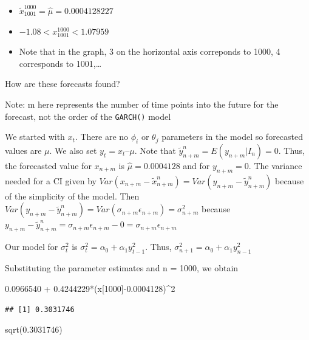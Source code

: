 \documentclass[
]{book}
\newenvironment{Shaded}{\begin{snugshade}}{\end{snugshade}}
\newcommand{\DecValTok}[1]{\textcolor[rgb]{0.00,0.00,0.81}{#1}}
\newcommand{\FloatTok}[1]{\textcolor[rgb]{0.00,0.00,0.81}{#1}}
\newcommand{\FunctionTok}[1]{\textcolor[rgb]{0.00,0.00,0.00}{#1}}
\newcommand{\NormalTok}[1]{#1}
\newcommand{\SpecialCharTok}[1]{\textcolor[rgb]{0.00,0.00,0.00}{#1}}
\theoremstyle{definition}
\theoremstyle{definition}
\theoremstyle{definition}
\theoremstyle{definition}
\theoremstyle{remark}
\begin{document}
\begin{itemize}
\item
  \(\tilde x^{1000}_{1001}=\hat \mu=0.0004128227\)
\item
  \(-1.08<x^{1000}_{1001}<1.07959\)
\item
  Note that in the graph, 3 on the horizontal axis correponds to 1000, 4 corresponds to 1001,\ldots{}
\end{itemize}

How are these forecasts found?

Note: m here represents the number of time points into the future for the forecast, not the order of the \texttt{GARCH()} model

We started with \(x_t\). There are no \(\phi_i\) or \(\theta_j\) parameters in the model so forecasted values are \(\mu\). We also set \(y_t = x_t – \mu\). Note that \(\tilde y^n_{n+m}= E(y_{n+m} | I_n) = 0\). Thus, the forecasted value for \(x_{n+m}\) is \(\hat \mu=0.0004128\) and for \(y_{n+m} = 0\). The variance needed for a CI given by \(Var(x_{n+m}-\tilde x^n_{n+m})=Var(y_{n+m}-\tilde y^n_{n+m})\) because of the simplicity of the model. Then \(Var(y_{n+m}-\tilde y^n_{n+m})=Var(\sigma_{n+m}\epsilon_{n+m})=\sigma^2_{n+m}\) because \(y_{n+m}-\tilde y^n_{n+m}=\sigma_{n+m}\epsilon_{n+m}-0=\sigma_{n+m}\epsilon_{n+m}\)

Our model for \(\sigma_t^2\) is \(\sigma_t^2=\alpha_0+\alpha_1y_{t-1}^2\). Thus, \(\sigma_{n+1}^2=\alpha_0+\alpha_1y^2_{n-1}\)

Substituting the parameter estimates and n = 1000, we obtain

\begin{Shaded}
\begin{Highlighting}[]
\FloatTok{0.0966540} \SpecialCharTok{+} \FloatTok{0.4244229}\SpecialCharTok{*}\NormalTok{(x[}\DecValTok{1000}\NormalTok{]}\SpecialCharTok{{-}}\FloatTok{0.0004128}\NormalTok{)}\SpecialCharTok{\^{}}\DecValTok{2}
\end{Highlighting}
\end{Shaded}

\begin{verbatim}
## [1] 0.3031746
\end{verbatim}

\begin{Shaded}
\begin{Highlighting}[]
\FunctionTok{sqrt}\NormalTok{(}\FloatTok{0.3031746}\NormalTok{)}
\end{Highlighting}
\end{Shaded}
\end{document}
